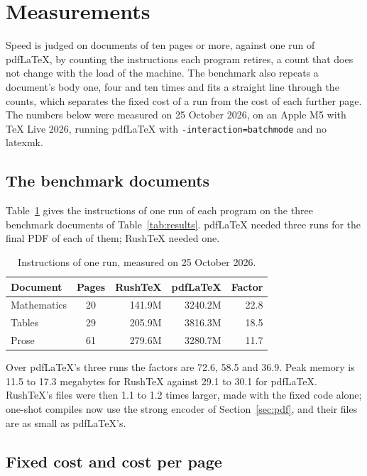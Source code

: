 \documentclass{article}
\numberwithin{equation}{section}
\theoremstyle{definition}
\theoremstyle{remark}
\begin{document}
\section{Measurements}\label{sec:measurements}

Speed is judged on documents of ten pages or more, against one run of pdfLaTeX, by
counting the instructions each program retires, a count that does not change with the
load of the machine. The benchmark also repeats a document's body one, four and ten
times and fits a straight line through the counts, which separates the fixed cost of a
run from the cost of each further page. The numbers below were measured on 25 October
2026, on an Apple M5 with \TeX{} Live 2026, running pdfLaTeX with
\texttt{-interaction=batchmode} and no latexmk.

\subsection{The benchmark documents}

Table~\ref{tab:bench} gives the instructions of one run of each program on the three
benchmark documents of Table~\ref{tab:results}. pdfLaTeX needed three runs for the final
PDF of each of them; RushTeX needed one.

\begin{table}[h]
\centering
\begin{tabular}{l c r r r}
Document & Pages & RushTeX & pdfLaTeX & Factor \\
\hline
Mathematics & 20 & 141.9M & 3240.2M & 22.8 \\
Tables & 29 & 205.9M & 3816.3M & 18.5 \\
Prose & 61 & 279.6M & 3280.7M & 11.7 \\
\end{tabular}
\caption{Instructions of one run, measured on 25 October 2026.}\label{tab:bench}
\end{table}

Over pdfLaTeX's three runs the factors are 72.6, 58.5 and 36.9. Peak memory is 11.5 to
17.3 megabytes for RushTeX against 29.1 to 30.1 for pdfLaTeX. RushTeX's files were then 1.1
to 1.2 times larger, made with the fixed code alone; one-shot compiles now use the strong
encoder of Section~\ref{sec:pdf}, and their files are as small as pdfLaTeX's.

\subsection{Fixed cost and cost per page}
\end{document}
